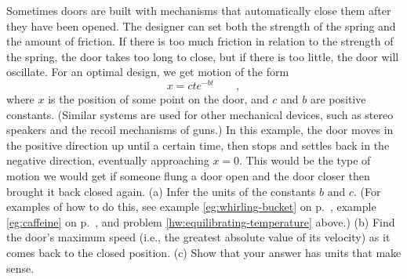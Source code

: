 Sometimes doors are built with mechanisms that automatically close them after
they have been opened. The designer can set both the strength of the spring
and the amount of friction. If there is too much friction in relation to the strength of the spring, the door takes
too long to close, but if there is too little, the door will oscillate.
For an optimal design, we get motion of the form
\begin{equation*}
 x=ct e^{-bt} \qquad ,
\end{equation*}
 where $x$ is the position of some point on the door,
and $c$ and $b$ are positive constants. (Similar systems are used for other mechanical devices, such as stereo
speakers and the recoil mechanisms of guns.) In this example, the door moves in the positive direction up until
a certain time, then stops and settles back in the negative direction, eventually approaching $x=0$. This would be
the type of motion we would get if someone flung a door open and the door closer then brought it back closed again.
(a) Infer the units of the constants $b$ and $c$.
(For examples of how to do this, see
example \ref{eg:whirling-bucket} on p.~\pageref{eg:whirling-bucket},
example \ref{eg:caffeine} on p.~\pageref{eg:caffeine},
and problem \ref{hw:equilibrating-temperature} above.)\hwendpart
(b) Find the door's maximum speed (i.e., the greatest absolute value of its velocity) as it 
comes back to the closed position.\answercheck\hwendpart
(c) Show that your answer has units that make sense.
